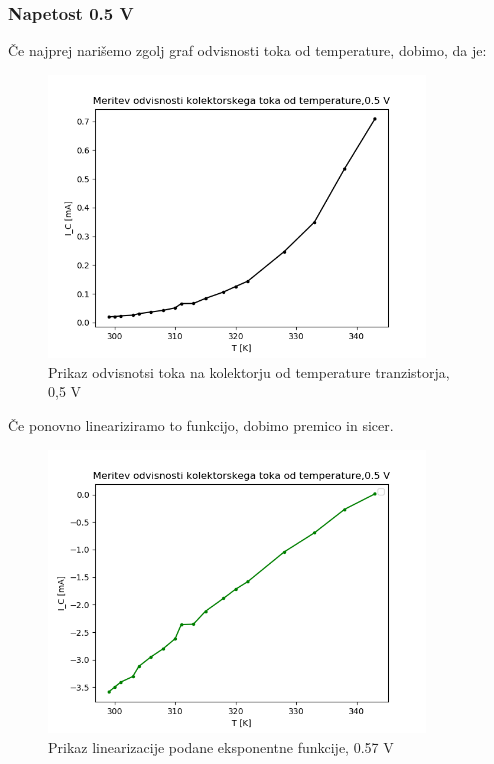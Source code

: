 \documentclass[11pt, a4paper]{article}
\theoremstyle{definition}
\theoremstyle{example}
\theoremstyle{izrek}
\begin{document}
\subsubsection{Napetost 0.5 V}
Če najprej narišemo zgolj graf odvisnosti toka od temperature, dobimo, da je: 
\begin{figure}[H]
    \centering
    \includegraphics[width=10cm]{Napetost-temperatura,0,5.png}
    \caption{Prikaz odvisnotsi toka na kolektorju od temperature tranzistorja, 0,5 V}
\end{figure}
Če ponovno lineariziramo to funkcijo, dobimo premico in sicer.
\begin{figure}[H]
    \centering
    \includegraphics[width=10cm]{Napetost-temperatura_fut,0,5.png}
    \caption{Prikaz linearizacije podane eksponentne funkcije, 0.57 V}
\end{figure}
\end{document}
